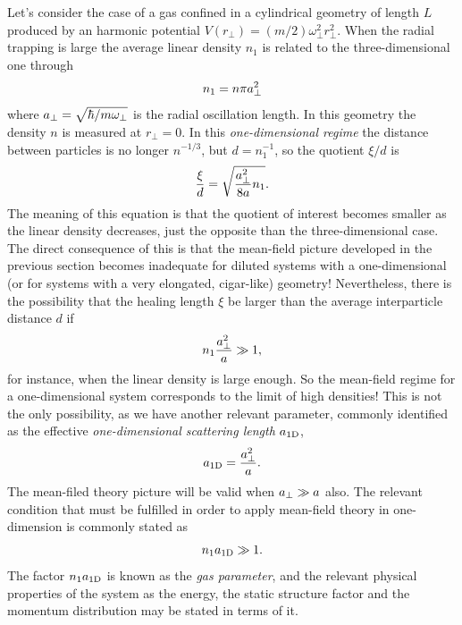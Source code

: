 Let's consider the case of a gas confined in a cylindrical geometry of length $L$ produced by an harmonic potential
$V(r_{\bot}) = (m/2)\omega^2_{\bot} r^2_\bot$. When the radial trapping is  large the average linear density $n_1$
is related to the three-dimensional one through
%
\begin{equation}
    n_1 = n \pi a^2_\bot
\end{equation}
%
where $a_\bot = \sqrt{\hbar / m \omega_\bot}$ is the radial oscillation length. In this geometry the density $n$ is measured at $r_\bot = 0$. In
this \emph{one-dimensional regime} the distance between particles is no longer $n^{-1/3}$, but $d =
n_1^{-1}$, so the
 quotient $\xi / d$ is
%
\begin{equation}
    \label{eq:mean-field-one-dim-quotient}
    \frac{\xi}{d} = \sqrt{\frac{a^2_\bot}{8a} n_1}.
\end{equation}
%
The meaning of this equation is that the quotient of interest becomes smaller as the linear density
decreases, just the
opposite than the three-dimensional case. The direct consequence of this is that the mean-field picture developed
in the previous section becomes inadequate for diluted systems with a one-dimensional (or for systems with a very
elongated, cigar-like) geometry!
%
Nevertheless, there is the possibility that the healing length $\xi$ be larger than the average interparticle distance
$d$ if
%
\begin{equation}
    n_1 \frac{a^2_{\bot}}{a} \gg 1,
\end{equation}
%
for instance, when the linear density is large enough. So the mean-field regime for a one-dimensional system
corresponds to the limit of high densities! This is not the only possibility, as we have another relevant
parameter, commonly identified as the effective \textit{one-dimensional scattering length} $a_{\mathrm{1D}}$,
%
\begin{equation}
    \label{eq:one-dim-scattering-length}
    a_{\mathrm{1D}} = \frac{a^2_{\bot}}{a}.
\end{equation}
%
The mean-filed theory picture will be valid when $a_{\bot} \gg a$ also. The relevant condition that must be
fulfilled in order to apply mean-field theory in one-dimension is commonly stated as
%
\begin{equation}
    n_1 a_\mathrm{1D} \gg 1.
\end{equation}
%
The factor $n_1 a_\mathrm{1D}$ is known as the \emph{gas parameter}, and the relevant physical
properties of the
system as the energy, the static structure factor and the momentum distribution may be stated in terms of it.

